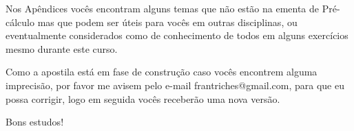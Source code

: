 Nos Apêndices vocês encontram alguns temas que não estão na ementa de Pré-cálculo mas que podem ser úteis para vocês em outras disciplinas, ou eventualmente considerados como de conhecimento de todos em alguns exercícios mesmo durante este curso.

Como a apostila está em fase de construção caso vocês encontrem alguma imprecisão, por favor me avisem pelo e-mail frantriches@gmail.com, para que eu possa corrigir, logo em seguida vocês receberão uma nova versão.

Bons estudos!